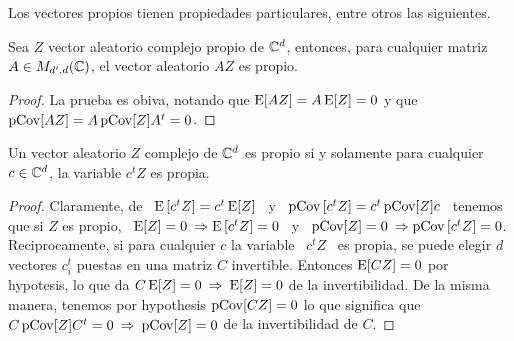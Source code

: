 Los vectores propios tienen  propiedades particulares, entre otros las siguientes.

\begin{teorema}\label{Teo:MP:PropioLineal}
%
  Sea  $Z$  vector  aleatorio  complejo  propio  de  $\mathbb{C}^d$,  entonces,  para
  cualquier matriz $A \in M_{d',d}(\mathbb{C})$, el vector aleatorio $A Z$ es propio.
\end{teorema}
\begin{proof}
  La prueba es obiva, notando que $\operatorname{E}[A Z]  = A \operatorname{E}[Z] = 0$ y que $\operatorname{pCov}[A Z]
  = A \operatorname{pCov}[Z] A^t = 0$.
\end{proof}


\begin{teorema}\label{Teo:MP:PropioProy}
%
  Un vector  aleatorio $Z$ complejo de  $\mathbb{C}^d$ es propio si  y solamente para
  cualquier $c \in \mathbb{C}^d$, la variable $c^t Z$ es propia.
\end{teorema}
\begin{proof}
  Claramente, de \  $\operatorname{E}\left[ c^t Z \right] = c^t \operatorname{E}[Z]$  \ y \ $\operatorname{pCov}\left[
    c^t Z \right] = c^t \operatorname{pCov}[Z] c$ \ tenemos que si $Z$ es propio, \ $\operatorname{E}[Z] =
  0  \: \Rightarrow  \operatorname{E}\left[ c^t  Z  \right] =  0$ \  y  \ $\operatorname{pCov}[Z]  = 0  \:
  \Rightarrow \operatorname{pCov}\left[  c^tZ \right] =  0$. \newline Reciprocamente,  si para
  cualquier $c$ la variable \ $c^t Z$  \ es propia, se puede elegir $d$ vectores
  $c_i^t$ puestas  en una matriz  $C$ invertible. Entonces  $\operatorname{E}[C Z] =  0$ por
  hypotesis, lo  que da  $C \operatorname{E}[Z] =  0 \:  \Rightarrow \: \operatorname{E}[Z]  = 0$  de la
  invertibilidad. De la misma manera, tenemos por hypothesis $\operatorname{pCov}[C Z] = 0$ lo
  que significa que  $C \operatorname{pCov}[Z] C^t = 0  \: \Rightarrow \: \operatorname{pCov}[Z] =  0$ de la
  invertibilidad de $C$.
\end{proof}



\label{Ssec:MP:MA}


